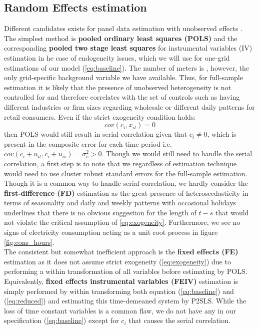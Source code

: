 \subsection{Random Effects estimation}
\label{subsec:e_re}
Different candidates exists for panel data estimation with unobserved effects \citep{wooldridge2010econometric}. The simplest method is \textbf{pooled ordinary least squares (POLS)} and the corresponding \textbf{pooled two stage least squares} for instrumental variables (IV) estimation in he case of endogeneity issues, which we will use for one-grid estimations of our model (\ref{eq:baseline}). The number of meters is , however, the only grid-specific background variable we have available. Thus, for full-sample estimation it is likely that the presence of unobserved heterogeneity is not controlled for and therefore correlates with the set of controls such as having different industries or firm sizes regarding wholesale or different daily patterns for retail consumers. Even if the strict exogeneity condition holds:
\begin{equation}
  cov(c_i, x_{it})=0
  \label{eq:exogeneity}
\end{equation}
then POLS would still result in serial correlation given that $c_i\neq0$, which is present in the composite error for each time period i.e. $cov(c_i+u_{it},c_i+u_{is})=\sigma_c^2>0$. Though we would still need to handle the serial correlation, a first step is to note that we regardless of estimation technique would need to use cluster robust standard errors for the full-sample estimation.
\medskip\\
Though it is a common way to handle serial correlation, we hardly consider the \textbf{first-difference (FD)} estimation as the great presence of heteroscedasticity in terms of seasonality and daily and weekly patterns with occasional holidays underlines that there is no obvious suggestion for the length of $t-s$ that would not violate the critical assumption of \eqref{eq:exogeneity}. Furthermore, we see no signs of electricity consumption acting as a unit root process in figure \ref{fig:cons_hours}.
\medskip\\
The consistent but somewhat inefficient approach is the \textbf{fixed effects (FE)} estimation as it does not assume strict exogeneity (\ref{eq:exogeneity}) due to performing a within transformation of all variables before estimating by POLS. Equivalently, \textbf{fixed effects instrumental variables (FEIV)} estimation is simply performed by within transforming both equation (\ref{eq:baseline}) and (\ref{eq:reduced}) and estimating this time-demeaned system by P2SLS. While the loss of time constant variables is a common flaw, we do not have any in our specification (\ref{eq:baseline}) except for $c_i$ that causes the serial correlation.
